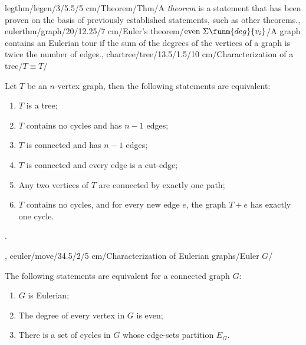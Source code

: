 legthm/legen/3/5.5/5 cm/Theorem/Thm/{A \emph{theorem} is a statement that has been proven on the basis of previously established statements, such as other theorems.},
eulerthm/graph/20/12.25/7 cm/{Euler's theorem}/$\mbox{even}\ \Sigma{\funm{deg}{v_i}}$/{A graph contains an Eulerian tour if the sum of the degrees of the vertices of a graph is twice the number of edges.},
chartree/tree/13.5/1.5/10 cm/{Characterization of a tree}/{$T\equiv T$}/{Let $T$ be an $n$-vertex graph, then the following statements are equivalent:\begin{enumerate}\item $T$ is a tree; \item $T$ contains no cycles and has $n-1$ edges; \item $T$ is connected and has $n-1$ edges; \item $T$ is connected and every edge is a cut-edge; \item Any two vertices of $T$ are connected by exactly one path; \item $T$ contains no cycles, and for every new edge $e$, the graph $T+e$ has exactly one cycle.\end{enumerate}.},
ceuler/move/34.5/2/5 cm/{Characterization of Eulerian graphs}/{Euler $G$}/{The following statements are equivalent for a connected graph $G$:\begin{enumerate}\item $G$ is Eulerian; \item The degree of every vertex in $G$ is even; \item There is a set of cycles in $G$ whose edge-sets partition $E_G$.\end{enumerate}}